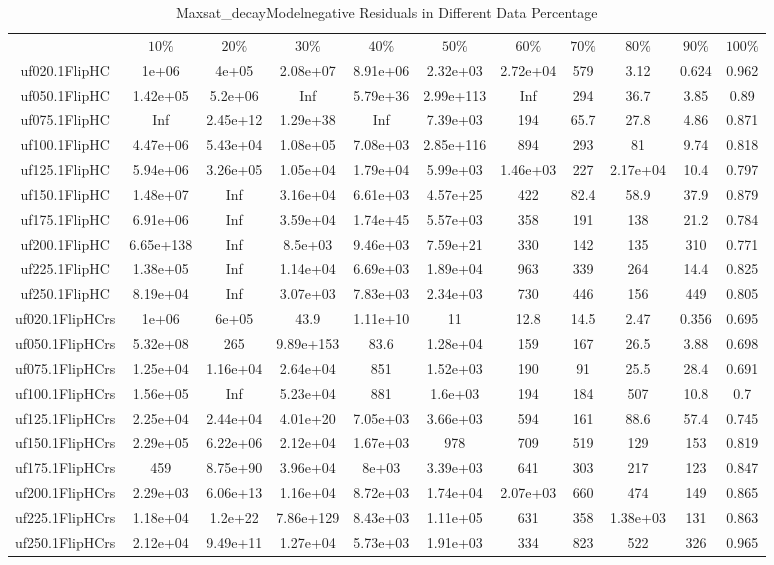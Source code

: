 \begin{table}[htbp]
\caption{Maxsat_decayModelnegative Residuals in Different Data Percentage}
\centering
\begin{tabular}{|ccccccccccc|}
\hline
 & $10\%$ & $20\%$ & $30\%$ & $40\%$ & $50\%$ & $60\%$ & $70\%$ & $80\%$ & $90\%$ & $100\%$ \\
uf020.1FlipHC & 1e+06 & 4e+05 & 2.08e+07 & 8.91e+06 & 2.32e+03 & 2.72e+04 &  579 & 3.12 & 0.624 & 0.962 \\
uf050.1FlipHC & 1.42e+05 & 5.2e+06 &  Inf & 5.79e+36 & 2.99e+113 &  Inf &  294 & 36.7 & 3.85 & 0.89 \\
uf075.1FlipHC &  Inf & 2.45e+12 & 1.29e+38 &  Inf & 7.39e+03 &  194 & 65.7 & 27.8 & 4.86 & 0.871 \\
uf100.1FlipHC & 4.47e+06 & 5.43e+04 & 1.08e+05 & 7.08e+03 & 2.85e+116 &  894 &  293 &   81 & 9.74 & 0.818 \\
uf125.1FlipHC & 5.94e+06 & 3.26e+05 & 1.05e+04 & 1.79e+04 & 5.99e+03 & 1.46e+03 &  227 & 2.17e+04 & 10.4 & 0.797 \\
uf150.1FlipHC & 1.48e+07 &  Inf & 3.16e+04 & 6.61e+03 & 4.57e+25 &  422 & 82.4 & 58.9 & 37.9 & 0.879 \\
uf175.1FlipHC & 6.91e+06 &  Inf & 3.59e+04 & 1.74e+45 & 5.57e+03 &  358 &  191 &  138 & 21.2 & 0.784 \\
uf200.1FlipHC & 6.65e+138 &  Inf & 8.5e+03 & 9.46e+03 & 7.59e+21 &  330 &  142 &  135 &  310 & 0.771 \\
uf225.1FlipHC & 1.38e+05 &  Inf & 1.14e+04 & 6.69e+03 & 1.89e+04 &  963 &  339 &  264 & 14.4 & 0.825 \\
uf250.1FlipHC & 8.19e+04 &  Inf & 3.07e+03 & 7.83e+03 & 2.34e+03 &  730 &  446 &  156 &  449 & 0.805 \\
uf020.1FlipHCrs & 1e+06 & 6e+05 & 43.9 & 1.11e+10 &   11 & 12.8 & 14.5 & 2.47 & 0.356 & 0.695 \\
uf050.1FlipHCrs & 5.32e+08 &  265 & 9.89e+153 & 83.6 & 1.28e+04 &  159 &  167 & 26.5 & 3.88 & 0.698 \\
uf075.1FlipHCrs & 1.25e+04 & 1.16e+04 & 2.64e+04 &  851 & 1.52e+03 &  190 &   91 & 25.5 & 28.4 & 0.691 \\
uf100.1FlipHCrs & 1.56e+05 &  Inf & 5.23e+04 &  881 & 1.6e+03 &  194 &  184 &  507 & 10.8 &  0.7 \\
uf125.1FlipHCrs & 2.25e+04 & 2.44e+04 & 4.01e+20 & 7.05e+03 & 3.66e+03 &  594 &  161 & 88.6 & 57.4 & 0.745 \\
uf150.1FlipHCrs & 2.29e+05 & 6.22e+06 & 2.12e+04 & 1.67e+03 &  978 &  709 &  519 &  129 &  153 & 0.819 \\
uf175.1FlipHCrs &  459 & 8.75e+90 & 3.96e+04 & 8e+03 & 3.39e+03 &  641 &  303 &  217 &  123 & 0.847 \\
uf200.1FlipHCrs & 2.29e+03 & 6.06e+13 & 1.16e+04 & 8.72e+03 & 1.74e+04 & 2.07e+03 &  660 &  474 &  149 & 0.865 \\
uf225.1FlipHCrs & 1.18e+04 & 1.2e+22 & 7.86e+129 & 8.43e+03 & 1.11e+05 &  631 &  358 & 1.38e+03 &  131 & 0.863 \\
uf250.1FlipHCrs & 2.12e+04 & 9.49e+11 & 1.27e+04 & 5.73e+03 & 1.91e+03 &  334 &  823 &  522 &  326 & 0.965 \\
\hline
\end{tabular}
\end{table}
